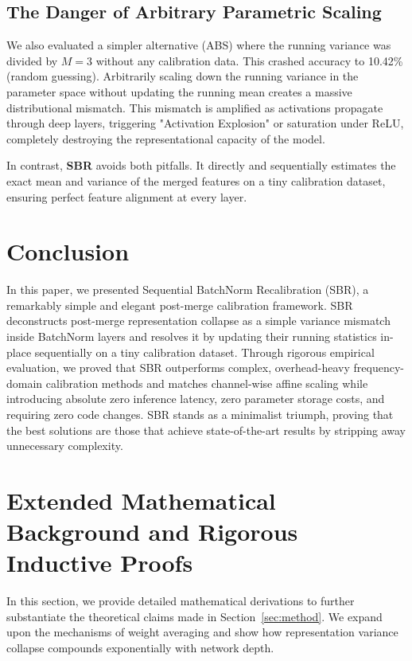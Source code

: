 \documentclass{article}
\theoremstyle{plain}
\theoremstyle{definition}
\theoremstyle{remark}
\begin{document}
\subsection{The Danger of Arbitrary Parametric Scaling}
We also evaluated a simpler alternative (ABS) where the running variance was divided by $M = 3$ without any calibration data. This crashed accuracy to 10.42\% (random guessing).
Arbitrarily scaling down the running variance in the parameter space without updating the running mean creates a massive distributional mismatch. This mismatch is amplified as activations propagate through deep layers, triggering "Activation Explosion" or saturation under ReLU, completely destroying the representational capacity of the model.

In contrast, \textbf{SBR} avoids both pitfalls. It directly and sequentially estimates the exact mean and variance of the merged features on a tiny calibration dataset, ensuring perfect feature alignment at every layer.

\section{Conclusion}
\label{sec:conclusion}
In this paper, we presented Sequential BatchNorm Recalibration (SBR), a remarkably simple and elegant post-merge calibration framework. SBR deconstructs post-merge representation collapse as a simple variance mismatch inside BatchNorm layers and resolves it by updating their running statistics in-place sequentially on a tiny calibration dataset. Through rigorous empirical evaluation, we proved that SBR outperforms complex, overhead-heavy frequency-domain calibration methods and matches channel-wise affine scaling while introducing absolute zero inference latency, zero parameter storage costs, and requiring zero code changes. SBR stands as a minimalist triumph, proving that the best solutions are those that achieve state-of-the-art results by stripping away unnecessary complexity.

\nocite{*}



\newpage
\appendix
\onecolumn
\section{Extended Mathematical Background and Rigorous Inductive Proofs}
\label{app:proofs}

In this section, we provide detailed mathematical derivations to further substantiate the theoretical claims made in Section~\ref{sec:method}. We expand upon the mechanisms of weight averaging and show how representation variance collapse compounds exponentially with network depth.
\end{document}
